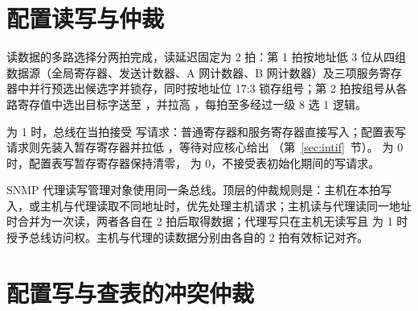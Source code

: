 \section{配置读写与仲裁}

读数据的多路选择分两拍完成，读延迟固定为 2 拍：第 1 拍按地址低 3 位从四组数据源（全局寄存器、发送计数器、A 网计数器、B 网计数器）及三项服务寄存器中并行预选出候选字并锁存，同时按地址位 17:3 锁存组号；第 2 拍按组号从各路寄存值中选出目标字送至 ，并拉高 ，每拍至多经过一级 8 选 1 逻辑。


 为 1 时，总线在当拍接受  写请求：普通寄存器和服务寄存器直接写入；配置表写请求则先装入暂存寄存器并拉低 ，等待对应核心给出 （第~\ref{sec:intif}~节）。 为 0 时，配置表写暂存寄存器保持清零， 为 0，不接受表初始化期间的写请求。

SNMP 代理读写管理对象使用同一条总线。顶层的仲裁规则是：主机在本拍写入，或主机与代理读取不同地址时，优先处理主机请求；主机读与代理读同一地址时合并为一次读，两者各自在 2 拍后取得数据；代理写只在主机无读写且  为 1 时授予总线访问权。主机与代理的读数据分别由各自的 2 拍有效标记对齐。

\section{配置写与查表的冲突仲裁}\label{sec:cfgok}

